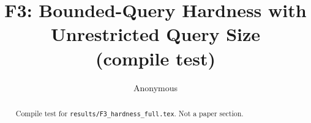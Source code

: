 \documentclass{article}
\title{F3: Bounded-Query Hardness with Unrestricted Query Size\\ (compile test)}
\author{Anonymous}
\begin{document}
\maketitle

\begin{abstract}
Compile test for \texttt{results/F3\_hardness\_full.tex}.  Not a paper section.
\end{abstract}





\end{document}

